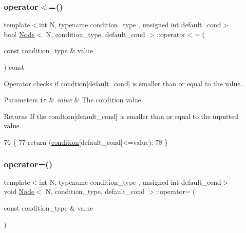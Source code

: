 \subsubsection{\texorpdfstring{operator$<$=()}{operator<=()}}
{\footnotesize\ttfamily template$<$int N, typename condition\+\_\+type , unsigned int default\+\_\+cond$>$ \\
bool \hyperlink{struct_node}{Node}$<$ N, condition\+\_\+type, default\+\_\+cond $>$\+::operator$<$= (\begin{DoxyParamCaption}\item[{const condition\+\_\+type \&}]{value }\end{DoxyParamCaption}) const\hspace{0.3cm}{\ttfamily [inline]}}

Operator checks if {\ttfamily condtion}\mbox{[}{\ttfamily default\+\_\+cond}\mbox{]} is smaller than or equal to the value. 
\begin{DoxyParams}[1]{Parameters}
\mbox{\tt in}  & {\em value} & The condition value. \\
\hline
\end{DoxyParams}
\begin{DoxyReturn}{Returns}
If the {\ttfamily condtion}\mbox{[}{\ttfamily default\+\_\+cond}\mbox{]} is smaller than or equal to the inputted value. 
\end{DoxyReturn}

\begin{DoxyCode}
76     \{
77         \textcolor{keywordflow}{return} (\hyperlink{struct_node_a84fa4c586396e81041eb3a4f6a46f418}{condition}[default\_cond]<=value);
78     \}
\end{DoxyCode}
\mbox{\label{struct_node_a1fd39050dc2575b78fdfe894c006c6af}} 
\subsubsection{\texorpdfstring{operator=()}{operator=()}}
{\footnotesize\ttfamily template$<$int N, typename condition\+\_\+type , unsigned int default\+\_\+cond$>$ \\
void \hyperlink{struct_node}{Node}$<$ N, condition\+\_\+type, default\+\_\+cond $>$\+::operator= (\begin{DoxyParamCaption}\item[{const condition\+\_\+type \&}]{value }\end{DoxyParamCaption})\hspace{0.3cm}{\ttfamily [inline]}}

